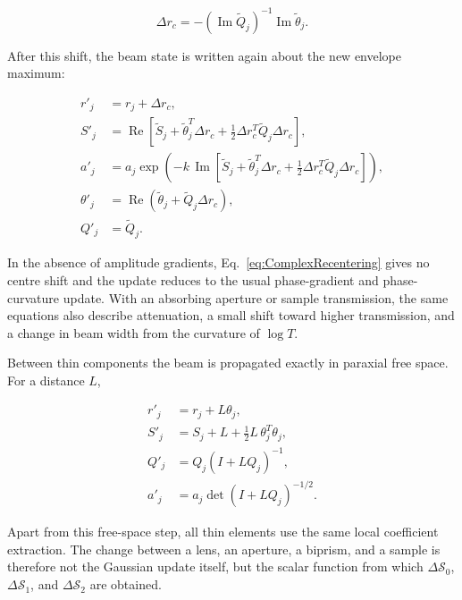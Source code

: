 \documentclass{article}
\begin{document}
\begin{equation}
\Delta r_c = -(\operatorname{Im}\tilde{Q}_j)^{-1}\operatorname{Im}\tilde{\theta}_j .
\label{eq:ComplexRecentering}
\end{equation}

After this shift, the beam state is written again about the new envelope maximum:

\begin{equation}
\begin{aligned}
r'_j &= r_j+\Delta r_c, \\
S'_j &= \operatorname{Re}\left[\tilde{S}_j+\tilde{\theta}_j^T\Delta r_c+\frac{1}{2}\Delta r_c^T\tilde{Q}_j\Delta r_c\right], \\
a'_j &= a_j\exp\left(-k\,\operatorname{Im}\left[\tilde{S}_j+\tilde{\theta}_j^T\Delta r_c+\frac{1}{2}\Delta r_c^T\tilde{Q}_j\Delta r_c\right]\right), \\
\theta'_j &= \operatorname{Re}\left(\tilde{\theta}_j+\tilde{Q}_j\Delta r_c\right), \\
Q'_j &= \tilde{Q}_j .
\end{aligned}
\label{eq:RecentredGaussianState}
\end{equation}

In the absence of amplitude gradients, Eq.~\eqref{eq:ComplexRecentering} gives no centre shift and the update reduces to the usual phase-gradient and phase-curvature update. 
With an absorbing aperture or sample transmission, the same equations also describe attenuation, a small shift toward higher transmission, and a change in beam width from the curvature of $\log T$.

Between thin components the beam is propagated exactly in paraxial free space. 
For a distance $L$,

\begin{equation}
\begin{aligned}
r'_j &= r_j+L\theta_j, \\
S'_j &= S_j+L+\frac{1}{2}L\,\theta_j^T\theta_j, \\
Q'_j &= Q_j(I+LQ_j)^{-1}, \\
a'_j &= a_j\det(I+LQ_j)^{-1/2}.
\end{aligned}
\label{eq:FreeSpaceGaussianUpdate}
\end{equation}

Apart from this free-space step, all thin elements use the same local coefficient extraction. 
The change between a lens, an aperture, a biprism, and a sample is therefore not the Gaussian update itself, but the scalar function from which $\Delta\mathcal{S}_0$, $\Delta\mathcal{S}_1$, and $\Delta\mathcal{S}_2$ are obtained.
\end{document}
